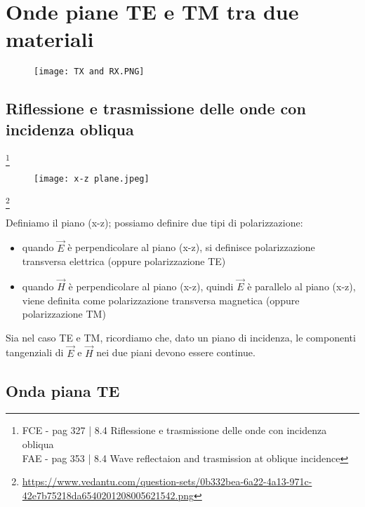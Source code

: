 \chapter{Onde piane TE e TM tra due materiali} 
\begin{figure}[h]
    \centering
    \texttt{[image: TX and RX.PNG]}
    
\end{figure}    

\newpage 

\section{Riflessione e trasmissione delle onde con incidenza obliqua} 

\footnote{FCE - pag 327 | 8.4 Riflessione e trasmissione delle onde con incidenza obliqua \\ 
FAE - pag 353 | 8.4 Wave reflectaion and trasmission at oblique incidence}

\begin{figure}[h]
    \centering
    \texttt{[image: x-z plane.jpeg]}
    
\end{figure}  

\footnote{\url{https://www.vedantu.com/question-sets/0b332bea-6a22-4a13-971c-42e7b75218da6540201208005621542.png}}

Definiamo il piano (x-z); possiamo definire due tipi di polarizzazione: 

\begin{itemize}
    \item quando $\vec{E}$ è perpendicolare al piano (x-z), si definisce polarizzazione transversa elettrica (oppure polarizzazione TE)
    \item quando $\vec{H}$ è perpendicolare al piano (x-z), quindi $\vec{E}$ è parallelo al piano (x-z), viene definita come polarizzazione transversa magnetica (oppure polarizzazione TM)
\end{itemize}


Sia nel caso TE e TM, ricordiamo che, dato un piano di incidenza, le componenti tangenziali di $\vec{E}$ e $\vec{H}$ 
nei due piani devono essere continue. \\ 

\newpage 

\section{Onda piana TE} 

